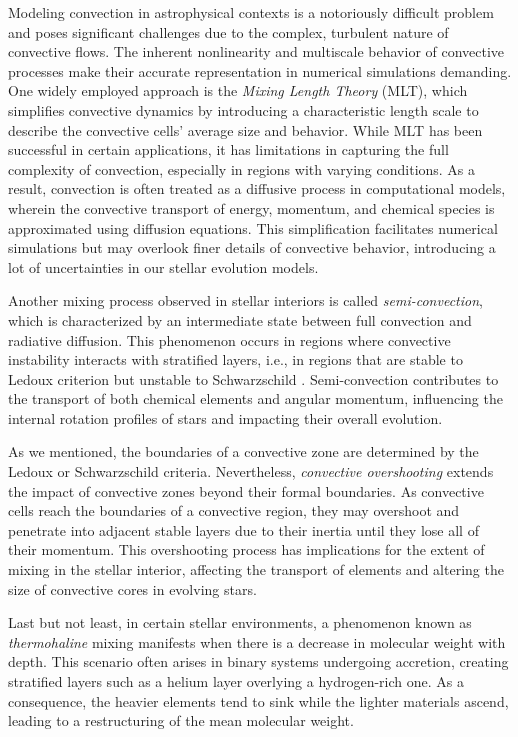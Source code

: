 \documentclass[main.tex]{subfiles}
\begin{document}
    Modeling convection in astrophysical contexts is a notoriously difficult problem and poses significant challenges due to the complex, turbulent nature of convective flows. The inherent nonlinearity and multiscale behavior of convective processes make their accurate representation in numerical simulations demanding. One widely employed approach is the \textit{Mixing Length Theory} (MLT), which simplifies convective dynamics by introducing a characteristic length scale to describe the convective cells' average size and behavior. While MLT has been successful in certain applications, it has limitations in capturing the full complexity of convection, especially in regions with varying conditions. As a result, convection is often treated as a diffusive process in computational models, wherein the convective transport of energy, momentum, and chemical species is approximated using diffusion equations. This simplification facilitates numerical simulations but may overlook finer details of convective behavior, introducing a lot of uncertainties in our stellar evolution models.

    Another mixing process observed in stellar interiors is called \textit{semi-convection}, which is characterized by an intermediate state between full convection and radiative diffusion. This phenomenon occurs in regions where convective instability interacts with stratified layers, i.e., in regions that are stable to Ledoux criterion but unstable to Schwarzschild \citep[see][]{spruit:semiconvection}. Semi-convection contributes to the transport of both chemical elements and angular momentum, influencing the internal rotation profiles of stars and impacting their overall evolution.

    As we mentioned, the boundaries of a convective zone are determined by the Ledoux or Schwarzschild criteria. Nevertheless, \textit{convective overshooting} extends the impact of convective zones beyond their formal boundaries. As convective cells reach the boundaries of a convective region, they may overshoot and penetrate into adjacent stable layers due to their inertia until they lose all of their momentum. This overshooting process has implications for the extent of mixing in the stellar interior, affecting the transport of elements and altering the size of convective cores in evolving stars.
    
    Last but not least, in certain stellar environments, a phenomenon known as \textit{thermohaline} mixing manifests when there is a decrease in molecular weight with depth. This scenario often arises in binary systems undergoing accretion, creating stratified layers such as a helium layer overlying a hydrogen-rich one. As a consequence, the heavier elements tend to sink while the lighter materials ascend, leading to a restructuring of the mean molecular weight.
\end{document}
